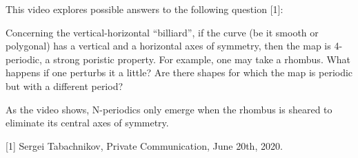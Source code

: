 This video explores possible answers to the following question [1]: 

Concerning the vertical-horizontal “billiard”, if the curve (be it smooth or polygonal) has a vertical and a horizontal axes of symmetry, then the map is 4-periodic, a strong poristic property. For example, one may take a rhombus. What happens if one perturbs it a little? Are there shapes for which the map is periodic but with a different period?

As the video shows, N-periodics only emerge when the rhombus is sheared to eliminate its central axes of symmetry.

[1] Sergei Tabachnikov, Private Communication, June 20th, 2020.